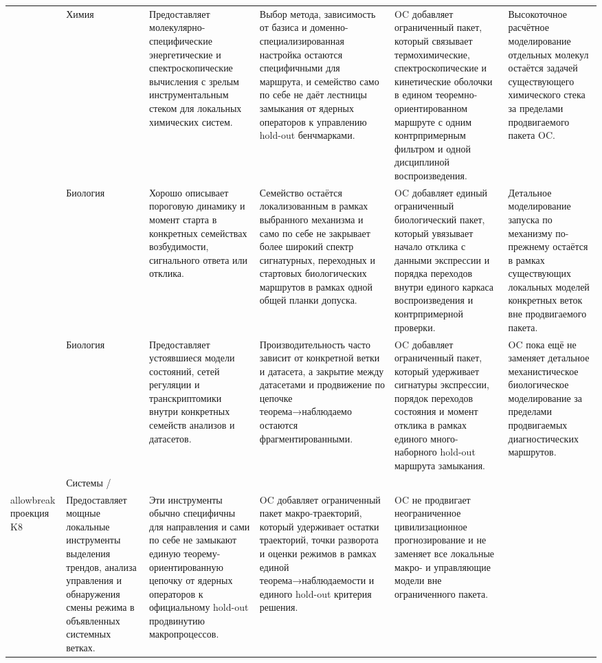 \begin{longtable}{@{}L{0.17\textwidth}L{0.09\textwidth}L{0.17\textwidth}L{0.17\textwidth}L{0.20\textwidth}L{0.14\textwidth}@{}}
 & Химия & Предоставляет молекулярно-специфические энергетические и спектроскопические вычисления с зрелым инструментальным стеком для локальных химических систем. & Выбор метода, зависимость от базиса и доменно-специализированная настройка остаются специфичными для маршрута, и семейство само по себе не даёт лестницы замыкания от ядерных операторов к управлению hold-out бенчмарками. & OC добавляет ограниченный пакет, который связывает термохимические, спектроскопические и кинетические оболочки в едином теоремно-ориентированном маршруте с одним контрпримерным фильтром и одной дисциплиной воспроизведения. & Высокоточное расчётное моделирование отдельных молекул остаётся задачей существующего химического стека за пределами продвигаемого пакета OC. \\
 & Биология & Хорошо описывает пороговую динамику и момент старта в конкретных семействах возбудимости, сигнального ответа или отклика. & Семейство остаётся локализованным в рамках выбранного механизма и само по себе не закрывает более широкий спектр сигнатурных, переходных и стартовых биологических маршрутов в рамках одной общей планки допуска. & OC добавляет единый ограниченный биологический пакет, который увязывает начало отклика с данными экспрессии и порядка переходов внутри единого каркаса воспроизведения и контрпримерной проверки. & Детальное моделирование запуска по механизму по-прежнему остаётся в рамках существующих локальных моделей конкретных веток вне продвигаемого пакета. \\
 & Биология & Предоставляет устоявшиеся модели состояний, сетей регуляции и транскриптомики внутри конкретных семейств анализов и датасетов. & Производительность часто зависит от конкретной ветки и датасета, а закрытие между датасетами и продвижение по цепочке теорема→наблюдаемо остаются фрагментированными. & OC добавляет ограниченный пакет, который удерживает сигнатуры экспрессии, порядок переходов состояния и момент отклика в рамках единого много-наборного hold-out маршрута замыкания. & OC пока ещё не заменяет детальное механистическое биологическое моделирование за пределами продвигаемых диагностических маршрутов. \\
 & Системы /\\allowbreak проекция K8 & Предоставляет мощные локальные инструменты выделения трендов, анализа управления и обнаружения смены режима в объявленных системных ветках. & Эти инструменты обычно специфичны для направления и сами по себе не замыкают единую теорему-ориентированную цепочку от ядерных операторов к официальному hold-out продвинутию макропроцессов. & OC добавляет ограниченный пакет макро-траекторий, который удерживает остатки траекторий, точки разворота и оценки режимов в рамках единой теорема→наблюдаемости и единого hold-out критерия решения. & OC не продвигает неограниченное цивилизационное прогнозирование и не заменяет все локальные макро- и управляющие модели вне ограниченного пакета. \\

\end{longtable}
